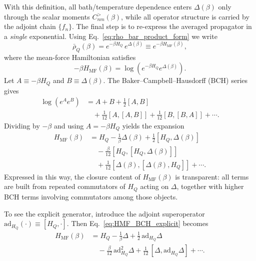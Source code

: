 With this definition, all bath/temperature dependence enters $\Delta(\beta)$ only through the scalar moments $C^{>}_{nm}(\beta)$, while all operator structure is carried by the adjoint chain $\{f_n\}$. The final step is to re-express the averaged propagator in a \emph{single} exponential. Using
Eq.~\eqref{eq:rho_bar_product_form} we write
\begin{equation}
    \bar\rho_Q(\beta)=e^{-\beta H_Q}\,e^{\Delta(\beta)} \equiv e^{-\beta H_{\mathrm{MF}}(\beta)},
    \label{eq:HMF_BCH_def_clean_repeat}
\end{equation}
where the mean-force Hamiltonian satisfies
\begin{equation}
    -\beta H_{\mathrm{MF}}(\beta)=\log\!\left(e^{-\beta H_Q}e^{\Delta(\beta)}\right).
\end{equation}
Let $A\equiv-\beta H_Q$ and $B\equiv \Delta(\beta)$. The Baker--Campbell--Hausdorff (BCH) series~\cite{magnusExponentialSolutionDifferential1954a,blanesMagnusExpansionIts2009,vanbruntVisser2015BCHClosedForms} gives
\begin{equation}
    \label{eq:BCH_AB_general}
    \begin{split}
        \log(e^{A}e^{B}) & = A+B+\frac{1}{2}[A,B]                                      \\
                         & \quad +\frac{1}{12}[A,[A,B]]+\frac{1}{12}[B,[B,A]]+\cdots .
    \end{split}
\end{equation}
Dividing by $-\beta$ and using $A=-\beta H_Q$ yields the expansion
\begin{equation}
    \label{eq:HMF_BCH_explicit}
    \begin{split}
        H_{\mathrm{MF}}(\beta) & = H_Q-\frac{1}{\beta}\Delta(\beta)
        +\frac{1}{2}[H_Q,\Delta(\beta)]                                                 \\
                               & \quad -\frac{\beta}{12}[H_Q,[H_Q,\Delta(\beta)]]       \\
                               & \quad +\frac{1}{12}[\Delta(\beta),[\Delta(\beta),H_Q]]
        +\cdots .
    \end{split}
\end{equation}
Expressed in this way, the closure content of $H_{\mathrm{MF}}(\beta)$ is transparent: all terms are built from repeated commutators of $H_Q$ acting on $\Delta$, together with higher BCH terms involving commutators among those objects.

To see the explicit generator, introduce the adjoint superoperator $\mathrm{ad}_{H_Q}(\cdot)\equiv[H_Q,\cdot]$.
Then Eq.~\eqref{eq:HMF_BCH_explicit} becomes
\begin{equation}
    \label{eq:HMF_ad_form}
    \begin{split}
        H_{\mathrm{MF}}(\beta) & = H_Q-\frac{1}{\beta}\Delta
        +\frac{1}{2}\,\mathrm{ad}_{H_Q}\Delta                                       \\
                               & \quad -\frac{\beta}{12}\,\mathrm{ad}_{H_Q}^2\Delta
        +\frac{1}{12}\,[\Delta,\mathrm{ad}_{H_Q}\Delta]
        +\cdots .
    \end{split}
\end{equation}

